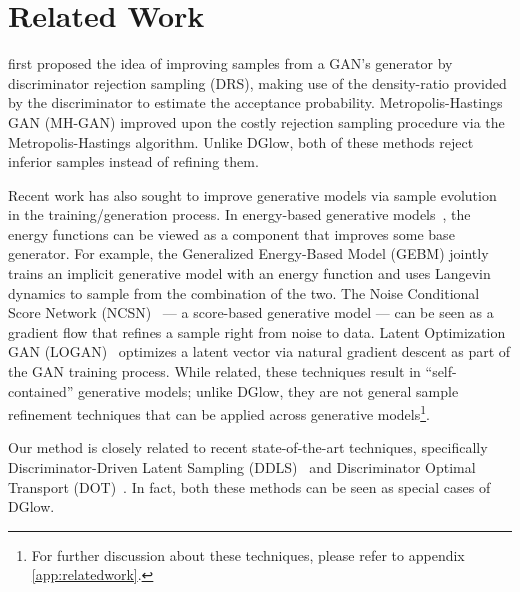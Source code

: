 \documentclass{article} \usepackage{iclr2021_conference,times}
\newcommand{\ourmethod}{\textsc{DG}low}
\begin{document}
 \vspace{-.8em}
\section{Related Work}
\vspace{-.8em}

\citet{azadi2018discriminator} first proposed the idea of improving samples from a GAN's generator by discriminator rejection sampling (DRS), making use of the density-ratio provided by the discriminator to estimate the acceptance probability.  Metropolis-Hastings GAN (MH-GAN) \citep{turner2019metropolis} improved upon the costly rejection sampling procedure via the Metropolis-Hastings algorithm. Unlike \ourmethod{},  both of these methods reject inferior samples instead of refining them. 

Recent work has also sought to improve generative models via sample evolution in the training/generation process. In energy-based generative models~\citep{arbel2020generalized, Deng2020Residual}, the energy functions can be viewed as a component that improves some base generator. For example, the Generalized Energy-Based Model (GEBM) \citep{arbel2020generalized} jointly trains an implicit generative model with an energy function and uses Langevin dynamics to sample from the combination of the two. The Noise Conditional Score Network (NCSN)~\citep{song2019generative,song2020improved} --- a score-based generative model --- can be seen as a gradient flow that refines a sample right from noise to data. Latent Optimization GAN (LOGAN)~\citep{wu2020logan} optimizes a latent vector via natural gradient descent as part of the GAN training process. While related,  these techniques result in ``self-contained'' generative models; unlike \ourmethod{}, they are not general sample refinement techniques that can be applied across generative models\footnote{For further discussion about these techniques, please refer to appendix \ref{app:relatedwork}.}.


Our method is closely related to recent state-of-the-art techniques, specifically Discriminator-Driven Latent Sampling (DDLS)~\citep{che2020your} and Discriminator Optimal Transport (DOT)~\citep{tanaka2019discriminator}. In fact, both these methods can be seen as special cases of \ourmethod{}. 
\end{document}
